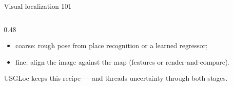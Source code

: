 \documentclass[aspectratio=169,10pt]{beamer}
\newcommand{\method}{USGLoc}
\newcommand{\srcnote}[1]{{\tiny\color{ink!55}#1}}
\begin{document}
\begin{frame}{Visual localization 101}
\begin{columns}[T]
\begin{column}{0.48\textwidth}
\begin{center}
      \end{center}
      \vspace{1mm}
      \begin{itemize}
        \item coarse: rough pose from place recognition or a learned
              regressor;
        \item fine: align the image against the map (features or
              render-and-compare).
      \end{itemize}
      \srcnote{\method{} keeps this recipe --- and threads uncertainty
      through both stages.}
    \end{column}
  \end{columns}
\end{frame}
\end{document}
